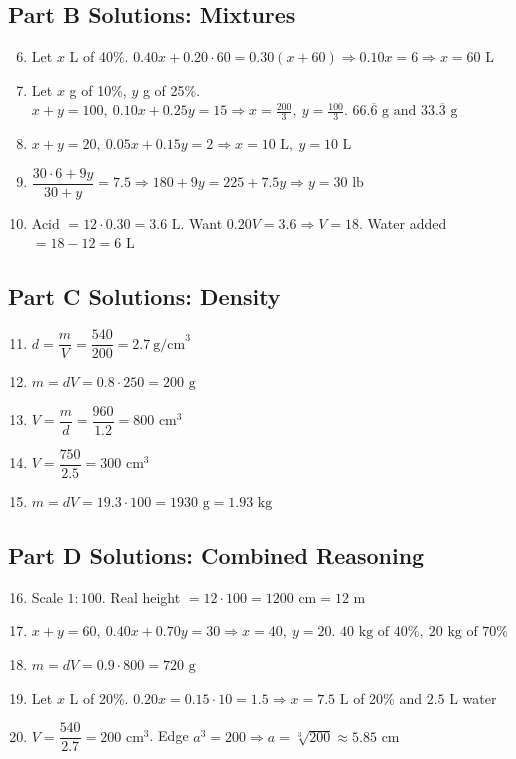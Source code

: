 \documentclass[14pt]{extarticle}
\begin{document}
\subsection*{Part B Solutions: Mixtures}
\begin{enumerate}
  \setcounter{enumi}{5}
  \item Let \(x\) L of 40\%. \(0.40x+0.20\cdot60=0.30(x+60)\Rightarrow 0.10x=6\Rightarrow \boxed{x=60\text{ L}}\)
  \item Let \(x\) g of 10\%, \(y\) g of 25\%. \(x+y=100,\ 0.10x+0.25y=15\Rightarrow x=\tfrac{200}{3},\ y=\tfrac{100}{3}\). \(\boxed{66.\overline{6}\text{ g and }33.\overline{3}\text{ g}}\)
  \item \(x+y=20,\ 0.05x+0.15y=2\Rightarrow \boxed{x=10\text{ L},\ y=10\text{ L}}\)
  \item \(\dfrac{30\cdot6+9y}{30+y}=7.5\Rightarrow 180+9y=225+7.5y\Rightarrow y= \boxed{30\text{ lb}}\)
  \item Acid \(=12\cdot0.30=3.6\text{ L}\). Want \(0.20V=3.6\Rightarrow V=18\). Water added \(=18-12=\boxed{6\text{ L}}\)
\end{enumerate}

\subsection*{Part C Solutions: Density}
\begin{enumerate}
  \setcounter{enumi}{10}
  \item \(d=\dfrac{m}{V}=\dfrac{540}{200}=\boxed{2.7\ \text{g/cm}^3}\)
  \item \(m=dV=0.8\cdot250=\boxed{200\text{ g}}\)
  \item \(V=\dfrac{m}{d}=\dfrac{960}{1.2}=\boxed{800\text{ cm}^3}\)
  \item \(V=\dfrac{750}{2.5}=\boxed{300\text{ cm}^3}\)
  \item \(m=dV=19.3\cdot100=\boxed{1930\text{ g}}=\boxed{1.93\text{ kg}}\)
\end{enumerate}

\subsection*{Part D Solutions: Combined Reasoning}
\begin{enumerate}
  \setcounter{enumi}{15}
  \item Scale \(1:100\). Real height \(=12\cdot100=\boxed{1200\text{ cm}}=\boxed{12\text{ m}}\)
  \item \(x+y=60,\ 0.40x+0.70y=30\Rightarrow x=40,\ y=20\). \(\boxed{40\text{ kg of 40\%},\ 20\text{ kg of 70\%}}\)
  \item \(m=dV=0.9\cdot800=\boxed{720\text{ g}}\)
  \item Let \(x\) L of 20\%. \(0.20x=0.15\cdot10=1.5\Rightarrow x=\boxed{7.5\text{ L}}\) of 20\% and \(2.5\) L water
  \item \(V=\dfrac{540}{2.7}=200\text{ cm}^3\). Edge \(a^3=200\Rightarrow a=\sqrt[3]{200}\approx \boxed{5.85\text{ cm}}\)
\end{enumerate}
\end{document}
